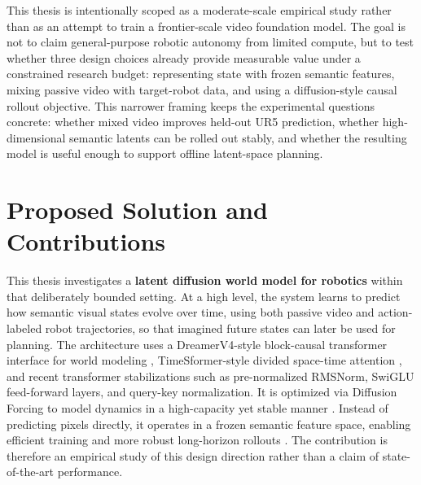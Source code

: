 \documentclass[12pt]{report}
\begin{document}
This thesis is intentionally scoped as a moderate-scale empirical study rather than as an attempt to train a frontier-scale video foundation model. The goal is not to claim general-purpose robotic autonomy from limited compute, but to test whether three design choices already provide measurable value under a constrained research budget: representing state with frozen semantic features, mixing passive video with target-robot data, and using a diffusion-style causal rollout objective. This narrower framing keeps the experimental questions concrete: whether mixed video improves held-out UR5 prediction, whether high-dimensional semantic latents can be rolled out stably, and whether the resulting model is useful enough to support offline latent-space planning.

\section{Proposed Solution and Contributions}
This thesis investigates a \textbf{latent diffusion world model for robotics} within that deliberately bounded setting. At a high level, the system learns to predict how semantic visual states evolve over time, using both passive video and action-labeled robot trajectories, so that imagined future states can later be used for planning. The architecture uses a DreamerV4-style block-causal transformer interface for world modeling \cite{hafner2025dreamerv4}, TimeSformer-style divided space-time attention \cite{bertasius2021timesformer, arnab2021vivit}, and recent transformer stabilizations such as pre-normalized RMSNorm, SwiGLU feed-forward layers, and query-key normalization. It is optimized via Diffusion Forcing to model dynamics in a high-capacity yet stable manner \cite{chen2024diffusionforcing}. Instead of predicting pixels directly, it operates in a frozen semantic feature space, enabling efficient training \cite{dt_rae2025} and more robust long-horizon rollouts \cite{zhou2024dinowm}. The contribution is therefore an empirical study of this design direction rather than a claim of state-of-the-art performance.
\end{document}
